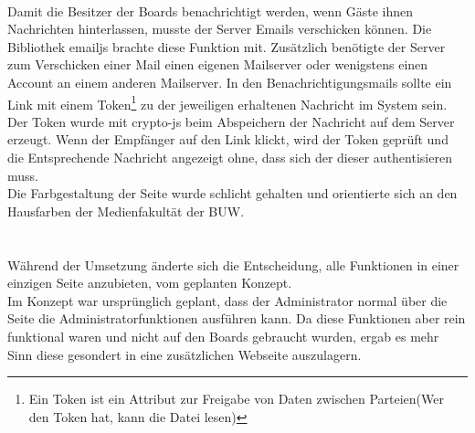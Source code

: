 \\
Damit die Besitzer der Boards benachrichtigt werden, wenn Gäste ihnen Nachrichten hinterlassen, musste der Server Emails verschicken können.
Die Bibliothek emailjs\cite{emailjs:website} brachte diese Funktion mit. Zusätzlich benötigte der Server zum Verschicken einer Mail einen eigenen Mailserver oder wenigstens einen Account an einem anderen Mailserver.
In den Benachrichtigungsmails sollte ein Link mit einem Token\footnote{Ein Token ist ein Attribut zur Freigabe von Daten zwischen Parteien(Wer den Token hat, kann die Datei lesen)} zu der jeweiligen erhaltenen Nachricht im System sein. Der Token wurde mit crypto-js beim Abspeichern der Nachricht auf dem Server erzeugt. Wenn der Empfänger auf den Link klickt, wird der Token geprüft und die Entsprechende Nachricht angezeigt ohne, dass sich der dieser authentisieren muss.
\\
Die Farbgestaltung der Seite wurde schlicht gehalten und orientierte sich an den Hausfarben der Medienfakultät der BUW.\\
\\
\\
Während der Umsetzung änderte sich die Entscheidung, alle Funktionen in einer einzigen Seite anzubieten, vom geplanten Konzept.\\
Im Konzept war ursprünglich geplant, dass der Administrator normal über die Seite die Administratorfunktionen ausführen kann. Da diese Funktionen aber rein funktional waren und nicht auf den Boards gebraucht wurden, ergab es mehr Sinn diese gesondert in eine zusätzlichen Webseite auszulagern.




